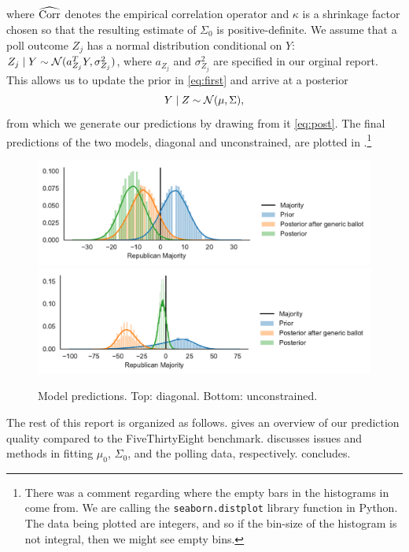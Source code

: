 \documentclass[12pt]{article}
\newcommand{\cm}{{\color{Red}{\textsf{[C]}}}}
\begin{document}
where $\widehat{\operatorname{Corr}}$ denotes the empirical correlation operator and $\kappa$ is a shrinkage factor chosen so that the resulting estimate of $\Sigma_0$ is positive-definite. We assume that a poll outcome $Z_j$ has a normal distribution conditional on $Y$: $Z_j \mid Y \sim \mathcal{N}(a_{Z_j}^T Y, \sigma_{Z_j}^2)$, where $a_{Z_j}$ and $\sigma_{Z_j}^2$ are specified in our orginal report. This allows us to update the prior in \eqref{eq:first} and arrive at a posterior \begin{equation}
  Y \mid Z \sim \mathcal{N}(\mu, \Sigma),
  \label{eq:post}
\end{equation}
from which we generate our predictions by drawing from it \eqref{eq:post}. The final predictions of the two models, diagonal and unconstrained, are plotted in .\footnote{\cm{} There was a comment regarding where the empty bars in the histograms in  come from. We are calling the \texttt{seaborn.distplot} library function in Python. The data being plotted are integers, and so if the bin-size of the histogram is not integral, then we might see empty bins. }
\begin{figure}[tb]
  \centering
  \includegraphics[width=.7\textwidth]{rep_seats_with_diagonal_prior.pdf}
  \includegraphics[width=.7\textwidth]{rep_seats.pdf}
  \caption{Model predictions. Top: diagonal. Bottom: unconstrained. }
  \label{fig:model}
\end{figure}

The rest of this report is organized as follows.  gives an overview of our prediction quality compared to the FiveThirtyEight benchmark.  discusses issues and methods in fitting $\mu_0$, $\Sigma_0$, and the polling data, respectively.  concludes.
\end{document}

